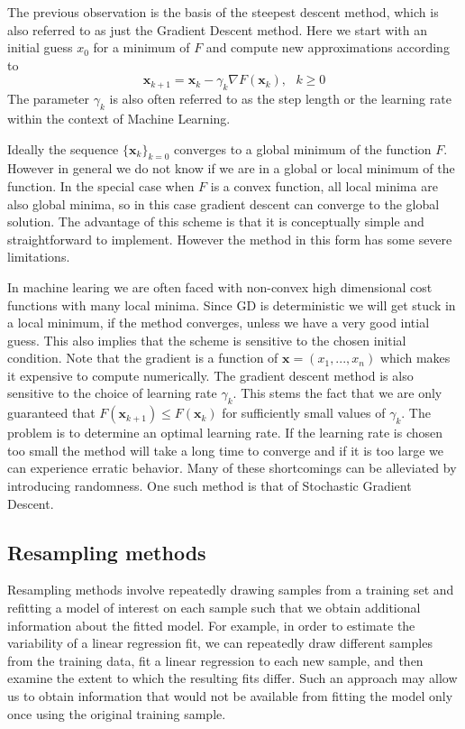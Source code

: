 \documentclass[a4paper, 10pt, english]{revtex4-2} %
\newcommand{\txt}[1]{\text{#1}}
\begin{document}
        The previous observation is the basis of the steepest descent method, which is also referred to as just the Gradient Descent method. 
        Here we start with an initial guess $x_0$ for a minimum of $F$ and compute new approximations according to
        \begin{equation}
                \mathbf{x}_{k+1}
            =   \mathbf{x}_k - \gamma_k\nabla F(\mathbf{x}_k), \txt{ } k \geq 0
        \end{equation}
        The parameter $\gamma_k$ is also often referred to as the step length or the learning rate within the context of Machine Learning.

        Ideally the sequence $\{\mathbf{x}_k\}_{k=0}$ converges to a global minimum of the function $F$. 
        However in general we do not know if we are in a global or local minimum of the function. 
        In the special case when $F$ is a convex function, all local minima are also global minima, so in this case gradient descent can converge to the global solution. 
        The advantage of this scheme is that it is conceptually simple and straightforward to implement.
        However the method in this form has some severe limitations.

        In machine learing we are often faced with non-convex high dimensional cost functions with many local minima. 
        Since GD is deterministic we will get stuck in a local minimum, if the method converges, unless we have a very good intial guess. 
        This also implies that the scheme is sensitive to the chosen initial condition.
        Note that the gradient is a function of $\mathbf{x} = (x_1, ..., x_n)$ which makes it expensive to compute numerically.
        The gradient descent method is also sensitive to the choice of learning rate $\gamma_k$. 
        This stems the fact that we are only guaranteed that $F(\mathbf{x}_{k+1}) \leq F(\mathbf{x}_k)$ for sufficiently small values of $\gamma_k$.
        The problem is to determine an optimal learning rate. 
        If the learning rate is chosen too small the method will take a long time to converge and if it is too large we can experience erratic behavior.
        Many of these shortcomings can be alleviated by introducing randomness. 
        One such method is that of Stochastic Gradient Descent.

    \subsection*{Resampling methods}
        Resampling methods involve repeatedly drawing samples from a training set and refitting a model of interest on each sample such that we obtain additional information about the fitted model.
        For example, in order to estimate the variability of a linear regression fit, we can repeatedly draw different samples from the training data, fit a linear regression to each new sample, and then examine the extent to which the resulting fits differ.
        Such an approach may allow us to obtain information that would not be available from fitting the model only once using the original training sample.
\end{document}
